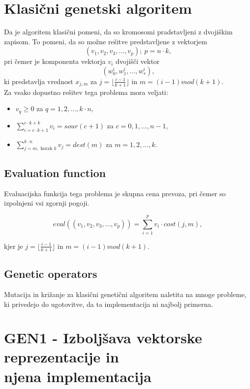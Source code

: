 \documentclass[12pt,a4paper,twoside]{article}
\theoremstyle{definition} %
\theoremstyle{plain} %
\numberwithin{equation}{section}  %
\begin{document}
\section{Klasični genetski algoritem}

Da je algoritem klasični pomeni, da so kromosomi pradstavljeni z dvojiškim zapisom. To pomeni, da so možne rešitve predstavljene z vektorjem $$(v_1, v_2, v_3, \dots, v_p);~p=n \cdot k \text{,}$$ pri čemer je komponenta vektorja $v_i$  dvojišči vektor $$(w_0^i, w_1^i, \dots, w_s^i) \text{,}$$ ki predstavlja vrednost $x_{j,m}$ za $j= \lfloor \frac{i-1}{k+1} \rfloor$ in $m= (i-1) mod (k+1)$. \\

\noindent Za vsako dopustno rešitev tega problema mora veljati:
\begin{itemize}
\item $v_q \geq 0$ za $q=1, 2, \dots, k \cdot n$,
\item $\sum\limits_{i=c \cdot k + 1}^{c \cdot k + k} v_i = sour(c+1)$ za $c=0, 1, \dots, n-1$,
\item $\sum\limits_{j=m, \text{ korak } k}^{k \cdot n} v_j = dest(m)$ za $m=1, 2, \dots, k$.
\end{itemize}

\subsection{Evaluation function}

Evaluacijska funkcija tega problema je skupna cena prevoza, pri čemer so izpolnjeni vsi zgornji pogoji.

$$eval((v_1, v_2, v_3, \dots, v_p)) = \sum\limits_{i=1}^{p} v_i \cdot cost(j,m),$$

kjer je $j=\lfloor \frac{i-1}{k+1} \rfloor$ in $m=(i-1) mod(k+1)$.

\subsection{Genetic operators}

Mutacija in križanje za klasični genetični algoritem naletita na mnoge probleme, ki privedejo do ugotovitve, da ta implementacija ni najbolj primerna.

\section{GEN1 - Izboljšava vektorske reprezentacije in \\ njena implementacija}
\end{document}
